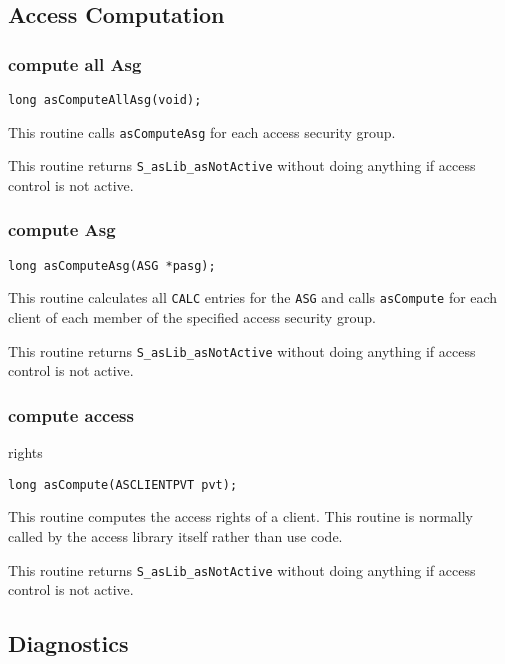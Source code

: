 \subsection{Access Computation}

\subsubsection{compute all Asg}

\begin{verbatim}long asComputeAllAsg(void); 
\end{verbatim}This routine calls \verb|asComputeAsg| for each access security group.

This routine returns \verb|S_asLib_asNotActive| without doing anything if access control is not active.

\subsubsection{compute Asg}

\begin{verbatim}long asComputeAsg(ASG *pasg); 
\end{verbatim}This routine calculates all \verb|CALC| entries for the \verb|ASG| and calls \verb|asCompute| for each client of each member of the specified 
access security group.

This routine returns \verb|S_asLib_asNotActive| without doing anything if access control is not active.

\subsubsection{compute access}

rights

\begin{verbatim}long asCompute(ASCLIENTPVT pvt); 
\end{verbatim}This routine computes the access rights of a client. This routine is normally called by the access library itself rather than 
use code.

This routine returns \verb|S_asLib_asNotActive| without doing anything if access control is not active.

\subsection{Diagnostics}

